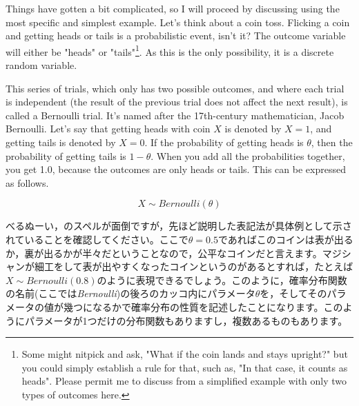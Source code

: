 \documentclass{ltjbook}
\begin{document}
Things have gotten a bit complicated, so I will proceed by discussing using the most specific and simplest example.
Let's think about a coin toss. Flicking a coin and getting heads or tails is a probabilistic event, isn't it?
The outcome variable will either be "heads" or "tails"\footnote{Some might nitpick and ask, "What if the coin lands and stays upright?" but you could simply establish a rule for that, such as, "In that case, it counts as heads". Please permit me to discuss from a simplified example with only two types of outcomes here.}. As this is the only possibility, it is a discrete random variable.

This series of trials, which only has two possible outcomes, and where each trial is independent (the result of the previous trial does not affect the next result), is called a Bernoulli trial. It's named after the 17th-century mathematician, Jacob Bernoulli. Let's say that getting heads with coin $X$ is denoted by $X=1$, and getting tails is denoted by $X=0$. If the probability of getting heads is $\theta$, then the probability of getting tails is $1-\theta$. When you add all the probabilities together, you get 1.0, because the outcomes are only heads or tails. This can be expressed as follows.

\[ X \sim Bernoulli(\theta) \]

べるぬーい，のスペルが面倒ですが，先ほど説明した表記法が具体例として示されていることを確認してください。ここで$\theta=0.5$であればこのコインは表が出るか，裏が出るかが半々だということなので，公平なコインだと言えます。マジシャンが細工をして表が出やすくなったコインというのがあるとすれば，たとえば$X \sim Bernoulli(0.8)$のように表現できるでしょう。このように，確率分布関数の名前(ここでは\textit{Bernoulli})の後ろのカッコ内にパラメータ$\theta$を，そしてそのパラメータの値が幾つになるかで確率分布の性質を記述したことになります。このようにパラメータが1つだけの分布関数もありますし，複数あるものもあります。
\end{document}
